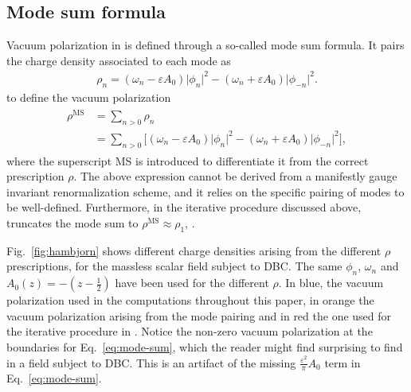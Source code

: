 %


\subsection{Mode sum formula}
\label{sec:mode-sum-formula}
Vacuum polarization in \cite{ambjorn_properties_1983} is defined through a so-called mode sum formula. It pairs the charge density associated to each mode as
\begin{align}
    \rho_n = (\omega_n-\varepsilon A_0)\lvert \phi_n \rvert^2  -(\omega_n+\varepsilon A_0)\lvert \phi_{-n} \rvert^2.
    \label{eq:mode-charge-density}
\end{align}
to define the vacuum polarization 
\begin{align}
\begin{split}
        \rho^\text{MS} &= \sum_{n>0}^{} \rho_n \\&= \sum_{n>0}^{}\big[(\omega_n-\varepsilon A_0)\lvert \phi_n \rvert^2
    - ( \omega_n +\varepsilon A_0) \lvert\phi_{-n}\rvert^2
    \big],
\end{split}
    \label{eq:mode-sum}    
\end{align}
where the superscript MS is introduced to differentiate it from the correct prescription $\rho$.
The above expression cannot be derived from a manifestly gauge invariant renormalization scheme, and it relies on the specific pairing of modes to be well-defined. 
Furthermore, in the iterative procedure discussed above,~\cite{ambjorn_properties_1983} truncates the mode sum to $\rho^\text{MS} \approx \rho_1$, . 

Fig.~\ref{fig:hambjorn} shows different charge densities arising from the different $\rho$ prescriptions, for the massless scalar field subject to DBC. The same $\phi_n$, $\omega_n$ and \linebreak$A_0(z) = -(z-\frac{1}{2})$ have been used for the different $\rho$. In blue, the vacuum polarization used in the computations throughout this paper, in orange the vacuum polarization arising from the mode pairing and in red the one used for the iterative procedure in \cite{ambjorn_properties_1983}. 
Notice the non-zero vacuum polarization at the boundaries for Eq.~\eqref{eq:mode-sum}, which the reader might find surprising to find in a field subject to DBC. This is an artifact of the missing $\frac{\varepsilon^2}{\pi}A_0$ term in Eq.~\eqref{eq:mode-sum}. 

